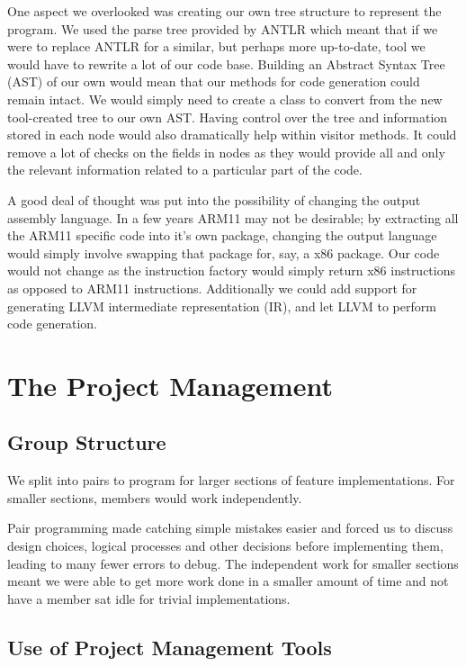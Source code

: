 \documentclass[11pt,a4paper]{article}
\begin{document}
One aspect we overlooked was creating our own tree structure to represent the program. We used the parse tree provided by ANTLR which meant that if we were to replace ANTLR for a similar, but perhaps more up-to-date, tool we would have to rewrite a lot of our code base. Building an Abstract Syntax Tree (AST) of our own would mean that our methods for code generation could remain intact. We would simply need to create a class to convert from the new tool-created tree to our own AST. Having control over the tree and information stored in each node would also dramatically help within visitor methods. It could remove a lot of checks on the fields in nodes as they would provide all and only the relevant information related to a particular part of the code. 

A good deal of thought was put into the possibility of changing the output assembly language. In a few years ARM11 may not be desirable; by extracting all the ARM11 specific code into it's own package, changing the output language would simply involve swapping that package for, say, a x86 package. Our code would not change as the instruction factory would simply return x86 instructions as opposed to ARM11 instructions. Additionally we could add support for generating LLVM intermediate representation (IR), and let LLVM to perform code generation.

\section{The Project Management}
\label{sec:The Project Management}

\subsection{Group Structure}
\label{sub:Group Structure}

We split into pairs to program for larger sections of feature implementations. For smaller sections, members would work independently.

Pair programming made catching simple mistakes easier and forced us to discuss design choices, logical processes and other decisions before implementing them, leading to many fewer errors to debug. The independent work for smaller sections meant we were able to get more work done in a smaller amount of time and not have a member sat idle for trivial implementations.

\subsection{Use of Project Management Tools}
\label{sub:Use of Project Management Tools}
\end{document}
